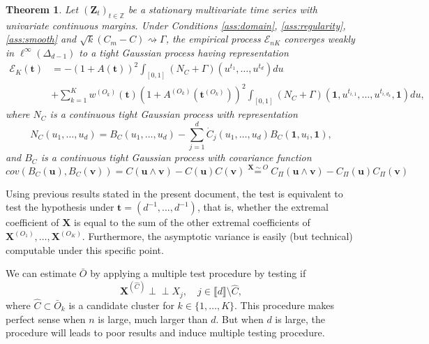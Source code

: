 \documentclass[11pt]{article}
\newtheorem{theorem}{Theorem}
\theoremstyle{definition}
\newcommand{\indep}{\perp \!\!\! \perp}
\begin{document}
	\begin{theorem}
		\label{thm:weak_conv}
		Let $(\textbf{Z}_t)_{t \in \mathbb{Z}}$ be a stationary multivariate time series with univariate continuous margins. Under Conditions \ref{ass:domain}, \ref{ass:regularity}, \ref{ass:smooth} and $\sqrt{k}(C_m - C) \rightsquigarrow \Gamma$, the empirical process $\mathcal{E}_{nK}$ converges weakly in $\ell^{\infty}(\Delta_{d-1})$ to a tight Gaussian process having representation
		\begin{align*}
			\mathcal{E}_K(\textbf{t}) &= -\left(1+A(\textbf{t})\right)^2 \int_{[0,1]} (N_C + \Gamma)(u^{t_1}, \dots, u^{t_d})du \\ &+ \sum_{k=1}^K w^{(O_k)}(\textbf{t})\left(1+A^{(O_k)}(\textbf{t}^{(O_k)})\right)^2 \int_{[0,1]} (N_C + \Gamma)(\textbf{1},u^{t_{i,1}}, \dots, u^{t_{i,d_k}}, \textbf{1})du,
		\end{align*}
		where $N_C$ is a continuous tight Gaussian process with representation 
		\begin{equation*}
			N_C(u_1,\dots,u_d) = B_C(u_1, \dots, u_d) - \sum_{j=1}^d \dot{C}_j(u_1, \dots, u_d) B_C(\textbf{1}, u_i, \textbf{1}),
		\end{equation*}
		and $B_C$ is a continuous tight Gaussian process with covariance function
		\begin{equation*}
			cov(B_C(\textbf{u}), B_C(\textbf{v})) = C(\textbf{u} \wedge \textbf{v}) - C(\textbf{u})C(\textbf{v}) \overset{\textbf{X}\sim O}{=} C_{\Pi}(\textbf{u} \wedge \textbf{v}) - C_{\Pi}(\textbf{u})C_{\Pi}(\textbf{v})
		\end{equation*}
	\end{theorem}
	Using previous results stated in the present document, the test is equivalent to test the hypothesis under $\textbf{t} = (d^{-1},\dots,d^{-1})$, that is, whether the extremal coefficient of $\textbf{X}$ is equal to the sum of the other extremal coefficients of $\textbf{X}^{(O_1)}, \dots, \textbf{X}^{(O_K)}$. Furthermore, the asymptotic variance is easily (but technical) computable under this specific point.
	
	We can estimate $\bar{O}$ by applying a multiple test procedure by testing if
	\begin{equation}
		\textbf{X}^{(\hat{C})} \indep X_j, \quad j \in \llbracket d \rrbracket \setminus \hat{C},
	\end{equation}	 
	where $\hat{C} \subset \bar{O}_k$ is a candidate cluster for $k \in \{1,\dots,K\}$. This procedure makes perfect sense when $n$ is large, much larger than $d$. But when $d$ is large, the procedure will leads to poor results and induce multiple testing procedure.
	
\end{document}
